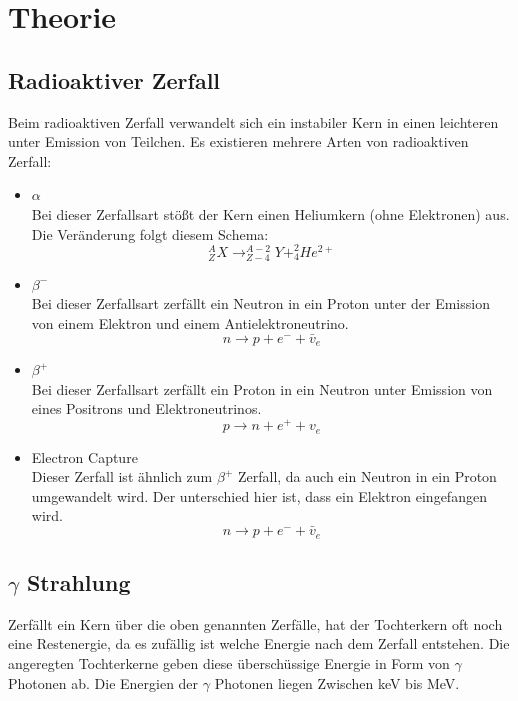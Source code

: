 \section{Theorie}
\subsection{Radioaktiver Zerfall}
Beim radioaktiven Zerfall verwandelt sich ein instabiler Kern in einen leichteren unter Emission von Teilchen. Es existieren mehrere Arten von radioaktiven Zerfall: 
\begin{itemize}
 \item $\alpha$\\
  {Bei dieser Zerfallsart stößt der Kern einen Heliumkern (ohne Elektronen) aus. Die Veränderung folgt diesem Schema:
  $$_Z^AX \rightarrow _{Z-4}^{A-2}Y + _4^2He^{2+}$$}
 \item $\beta^-$\\
 {Bei dieser Zerfallsart zerfällt ein Neutron in ein Proton unter der Emission von einem Elektron und einem Antielektroneutrino.  
 $$n\rightarrow p+e^-+\bar{v}_e$$} 
 \item $\beta^+$\\
 {Bei dieser Zerfallsart zerfällt ein Proton in ein Neutron unter Emission von eines Positrons und Elektroneutrinos.
 $$p\rightarrow n+e^++v_e$$}
 \item Electron Capture\\
  {Dieser Zerfall ist ähnlich zum $\beta^+$ Zerfall, da auch ein Neutron in ein Proton umgewandelt wird. Der unterschied hier ist, dass ein Elektron eingefangen wird.
 $$n\rightarrow p+e^-+\bar{v}_e$$}
\end{itemize}

\subsection{$\gamma$ Strahlung}
Zerfällt ein Kern über die oben genannten Zerfälle, hat der Tochterkern oft noch eine Restenergie, da es zufällig ist welche Energie nach dem Zerfall entstehen. Die angeregten Tochterkerne geben diese überschüssige Energie in Form von $\gamma$ Photonen ab. Die Energien der $\gamma$ Photonen liegen Zwischen keV bis MeV. 
